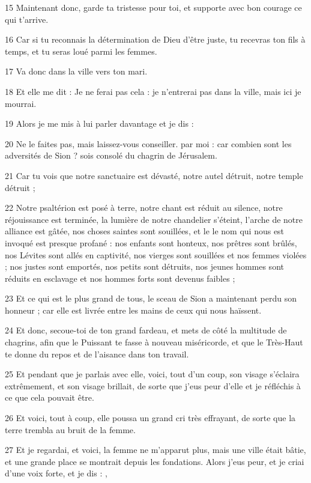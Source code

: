 \par 15 Maintenant donc, garde ta tristesse pour toi, et supporte avec bon courage ce qui t'arrive.
\par 16 Car si tu reconnais la détermination de Dieu d'être juste, tu recevras ton fils à temps, et tu seras loué parmi les femmes.
\par 17 Va donc dans la ville vers ton mari.
\par 18 Et elle me dit : Je ne ferai pas cela : je n'entrerai pas dans la ville, mais ici je mourrai.
\par 19 Alors je me mis à lui parler davantage et je dis :
\par 20 Ne le faites pas, mais laissez-vous conseiller. par moi : car combien sont les adversités de Sion ? sois consolé du chagrin de Jérusalem.
\par 21 Car tu vois que notre sanctuaire est dévasté, notre autel détruit, notre temple détruit ;
\par 22 Notre psaltérion est posé à terre, notre chant est réduit au silence, notre réjouissance est terminée, la lumière de notre chandelier s'éteint, l'arche de notre alliance est gâtée, nos choses saintes sont souillées, et le le nom qui nous est invoqué est presque profané : nos enfants sont honteux, nos prêtres sont brûlés, nos Lévites sont allés en captivité, nos vierges sont souillées et nos femmes violées ; nos justes sont emportés, nos petits sont détruits, nos jeunes hommes sont réduits en esclavage et nos hommes forts sont devenus faibles ;
\par 23 Et ce qui est le plus grand de tous, le sceau de Sion a maintenant perdu son honneur ; car elle est livrée entre les mains de ceux qui nous haïssent.
\par 24 Et donc, secoue-toi de ton grand fardeau, et mets de côté la multitude de chagrins, afin que le Puissant te fasse à nouveau miséricorde, et que le Très-Haut te donne du repos et de l'aisance dans ton travail.
\par 25 Et pendant que je parlais avec elle, voici, tout d'un coup, son visage s'éclaira extrêmement, et son visage brillait, de sorte que j'eus peur d'elle et je réfléchis à ce que cela pouvait être.
\par 26 Et voici, tout à coup, elle poussa un grand cri très effrayant, de sorte que la terre trembla au bruit de la femme.
\par 27 Et je regardai, et voici, la femme ne m'apparut plus, mais une ville était bâtie, et une grande place se montrait depuis les fondations. Alors j'eus peur, et je criai d'une voix forte, et je dis : ,
